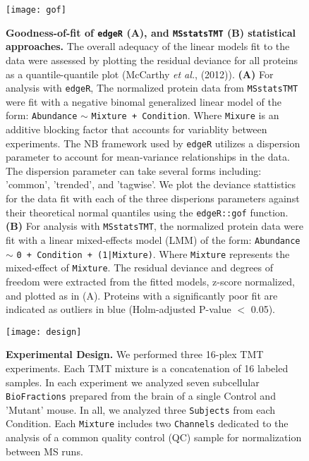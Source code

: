 \begin{figure}[h] %
	\begin{fullwidth}
		\begin{center}
		\texttt{[image: gof]}
		\caption{\textbf{Goodness-of-fit of \texttt{edgeR} (A), and 
		\texttt{MSstatsTMT} (B) statistical approaches.} The overall
		adequacy of the linear models fit to the data were assessed 
		by plotting the residual deviance for all proteins as a 
		quantile-quantile plot (McCarthy \textit{et al.}, (2012)). 
		\textbf{(A)} For analysis with \texttt{edgeR}, The normalized
		protein data from \texttt{MSstatsTMT} were fit with a negative
		binomal generalized linear model of the form: 
		\texttt{Abundance} $\sim$ \texttt{Mixture + Condition}.
		Where \texttt{Mixure} is an additive blocking factor that 
		accounts for variablity between experiments. 
		The NB framework used by \texttt{edgeR} utilizes a dispersion 
			parameter 
		to account for mean-variance relationships in the data.
		The dispersion parameter can take several forms including:
                'common', 'trended', and 'tagwise'. We plot the deviance
		stattistics for the data fit with each of
		the three disperions parameters against their 
		theoretical normal quantiles using the \texttt{edgeR::gof}
		function. \textbf{(B)} For analysis with \texttt{MSstatsTMT},
		the normalized protein data were fit with a linear mixed-effects 
		model (LMM) of the form: 
		\texttt{Abundance} $\sim$ \texttt{0 + Condition + (1|Mixture)}. 
		Where \texttt{Mixture} represents the mixed-effect
		of \texttt{Mixture}. The residual deviance and degrees of 
		freedom were extracted from the fitted models, z-score
		normalized, and plotted as in (A). Proteins with a significantly 
		poor fit are indicated as outliers in blue 
		(Holm-adjusted P-value $<$ 0.05).}
		\label{fig:gof}
	\end{center}
	\end{fullwidth}
\end{figure}


\begin{figure}[h] %
  \begin{fullwidth}
  \begin{center}
	  \texttt{[image: design]}
	  \caption{\textbf{Experimental Design.} We performed three 16-plex TMT
	  experiments. Each TMT mixture is a concatenation of 16 labeled
	  samples. In each experiment we analyzed seven subcellular
	  \texttt{BioFractions} prepared from the brain of a single Control
	  and 'Mutant' mouse. In all, we analyzed three \texttt{Subjects} from 
	  each {Condition}. Each \texttt{Mixture} includes two \texttt{Channels}
	  dedicated to the analysis of a common quality control (QC) sample for
	  normalization between MS runs.}
	  \label{fig:design}
  \end{center}
  \end{fullwidth}
\end{figure}


